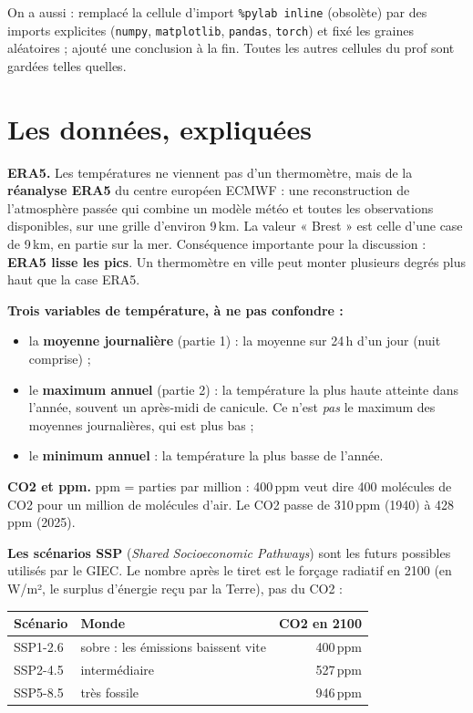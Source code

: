 \documentclass[11pt,a4paper]{article}
\newcommand{\f}[1]{\texttt{#1}}
\begin{document}
On a aussi : remplacé la cellule d'import \f{\%pylab inline} (obsolète) par des imports explicites (\f{numpy}, \f{matplotlib}, \f{pandas}, \f{torch}) et fixé les graines aléatoires ; ajouté une conclusion à la fin. Toutes les autres cellules du prof sont gardées telles quelles.

\section{Les données, expliquées}

\textbf{ERA5.} Les températures ne viennent pas d'un thermomètre, mais de la \textbf{réanalyse ERA5} du centre européen ECMWF : une reconstruction de l'atmosphère passée qui combine un modèle météo et toutes les observations disponibles, sur une grille d'environ 9\,km. La valeur « Brest » est celle d'une case de 9\,km, en partie sur la mer. Conséquence importante pour la discussion : \textbf{ERA5 lisse les pics}. Un thermomètre en ville peut monter plusieurs degrés plus haut que la case ERA5.

\textbf{Trois variables de température, à ne pas confondre :}
\begin{itemize}
  \item la \textbf{moyenne journalière} (partie 1) : la moyenne sur 24\,h d'un jour (nuit comprise) ;
  \item le \textbf{maximum annuel} (partie 2) : la température la plus haute atteinte dans l'année, souvent un après-midi de canicule. Ce n'est \emph{pas} le maximum des moyennes journalières, qui est plus bas ;
  \item le \textbf{minimum annuel} : la température la plus basse de l'année.
\end{itemize}

\textbf{CO2 et ppm.} ppm = parties par million : 400\,ppm veut dire 400 molécules de CO2 pour un million de molécules d'air. Le CO2 passe de 310\,ppm (1940) à 428\,ppm (2025).

\textbf{Les scénarios SSP} (\emph{Shared Socioeconomic Pathways}) sont les futurs possibles utilisés par le GIEC. Le nombre après le tiret est le forçage radiatif en 2100 (en W/m², le surplus d'énergie reçu par la Terre), pas du CO2 :

\begin{center}
\begin{tabular}{@{}llr@{}}
\toprule
\textbf{Scénario} & \textbf{Monde} & \textbf{CO2 en 2100} \\
\midrule
SSP1-2.6 & sobre : les émissions baissent vite & 400\,ppm \\
SSP2-4.5 & intermédiaire & 527\,ppm \\
SSP5-8.5 & très fossile & 946\,ppm \\
\bottomrule
\end{tabular}
\end{center}
\end{document}
